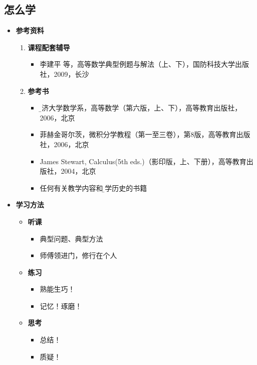 \subsection{怎么学}
	
\begin{itemize}
	\item {\bf 参考资料}
  	\begin{enumerate}
		\item {\bf 课程配套辅导}
	  	\begin{itemize}
	    	\item {李建平 等，高等数学典型例题与解法（上、下），国防科技大学出版社，2009，长沙} 
	  	\end{itemize}
  		\item {\bf 参考书} 
  		\begin{itemize}
	    	\item {\b 同济大学数学系，高等数学（第六版，上、下），高等教育出版社，2006，北京} 
	    	\item 菲赫金哥尔茨，微积分学教程（第一至三卷），第8版，高等教育出版社，2006，北京 
	    	\item James Stewart, Calculus(5th eds.)（影印版，上、下册），高等教育出版社，2004，北京
	    	\item 任何有关教学内容和{\b 数学历史}的书籍
  		\end{itemize}
	\end{enumerate}
	  \item {\bf 学习方法}
	\begin{itemize}
	  		\item {\bf 听课}
		\begin{itemize}
	  		  \item 典型问题、典型方法
	    	  \item 师傅领进门，修行在个人
	 	\end{itemize}
	  		\item {\bf 练习}
	 	\begin{itemize}
	    		\item 熟能生巧！
	    		\item 记忆！琢磨！
	  	\end{itemize}
	  		\item {\bf 思考}
	  	\begin{itemize}
	    		\item 总结！
	    		\item 质疑！
	  	\end{itemize}
	\end{itemize}
\end{itemize}

